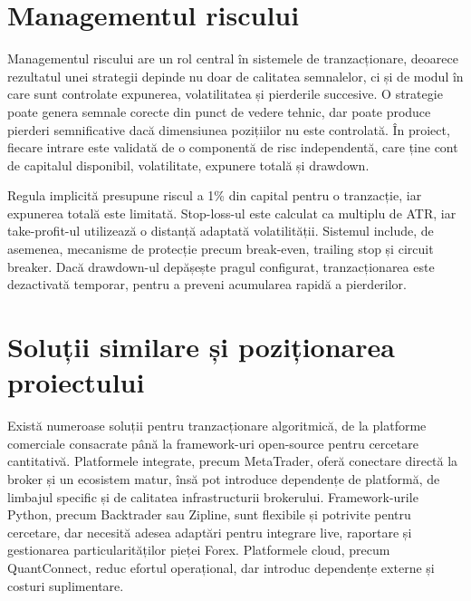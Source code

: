 \section{Managementul riscului}
\label{cap:cap2:risc}

Managementul riscului are un rol central în sistemele de tranzacționare, deoarece rezultatul unei strategii depinde nu doar de calitatea semnalelor, ci și de modul în care sunt controlate expunerea, volatilitatea și pierderile succesive. O strategie poate genera semnale corecte din punct de vedere tehnic, dar poate produce pierderi semnificative dacă dimensiunea pozițiilor nu este controlată. În proiect, fiecare intrare este validată de o componentă de risc independentă, care ține cont de capitalul disponibil, volatilitate, expunere totală și drawdown.

Regula implicită presupune riscul a 1\% din capital pentru o tranzacție, iar expunerea totală este limitată. Stop-loss-ul este calculat ca multiplu de ATR, iar take-profit-ul utilizează o distanță adaptată volatilității. Sistemul include, de asemenea, mecanisme de protecție precum break-even, trailing stop și circuit breaker. Dacă drawdown-ul depășește pragul configurat, tranzacționarea este dezactivată temporar, pentru a preveni acumularea rapidă a pierderilor.

\section{Soluții similare și poziționarea proiectului}
\label{cap:cap2:solutii}

Există numeroase soluții pentru tranzacționare algoritmică, de la platforme comerciale consacrate până la framework-uri open-source pentru cercetare cantitativă. Platformele integrate, precum MetaTrader, oferă conectare directă la broker și un ecosistem matur, însă pot introduce dependențe de platformă, de limbajul specific și de calitatea infrastructurii brokerului. Framework-urile Python, precum Backtrader sau Zipline, sunt flexibile și potrivite pentru cercetare, dar necesită adesea adaptări pentru integrare live, raportare și gestionarea particularităților pieței Forex. Platformele cloud, precum QuantConnect, reduc efortul operațional, dar introduc dependențe externe și costuri suplimentare.

